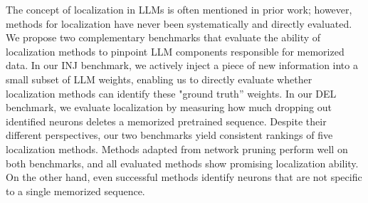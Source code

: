 The concept of localization in LLMs is often mentioned in prior work; however, methods for localization have never been systematically and directly evaluated. We propose two complementary benchmarks that evaluate the ability of localization methods to pinpoint LLM components responsible for memorized data. In our INJ benchmark, we actively inject a piece of new information into a small subset of LLM weights, enabling us to directly evaluate whether localization methods can identify these "ground truth'' weights. In our DEL benchmark, we evaluate localization by measuring how much dropping out identified neurons deletes a memorized pretrained sequence. Despite their different perspectives, our two benchmarks yield consistent rankings of five localization methods. Methods adapted from network pruning perform well on both benchmarks, and all evaluated methods show promising localization ability. On the other hand, even successful methods identify neurons that are not specific to a single memorized sequence.